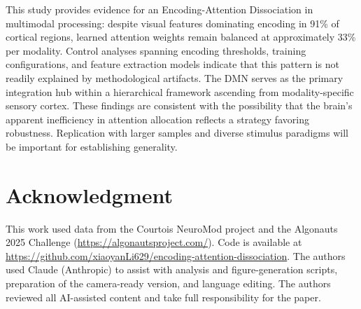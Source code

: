 \documentclass[conference]{IEEEtran}
\begin{document}
This study provides evidence for an Encoding-Attention Dissociation in multimodal processing: despite visual features dominating encoding in 91\% of cortical regions, learned attention weights remain balanced at approximately 33\% per modality. Control analyses spanning encoding thresholds, training configurations, and feature extraction models indicate that this pattern is not readily explained by methodological artifacts. The DMN serves as the primary integration hub within a hierarchical framework ascending from modality-specific sensory cortex. These findings are consistent with the possibility that the brain's apparent inefficiency in attention allocation reflects a strategy favoring robustness. Replication with larger samples and diverse stimulus paradigms will be important for establishing generality.

\section*{Acknowledgment}

This work used data from the Courtois NeuroMod project and the Algonauts 2025 Challenge (\url{https://algonautsproject.com/}). Code is available at \url{https://github.com/xiaoyanLi629/encoding-attention-dissociation}. The authors used Claude (Anthropic) to assist with analysis and figure-generation scripts, preparation of the camera-ready version, and language editing. The authors reviewed all AI-assisted content and take full responsibility for the paper.
\end{document}
